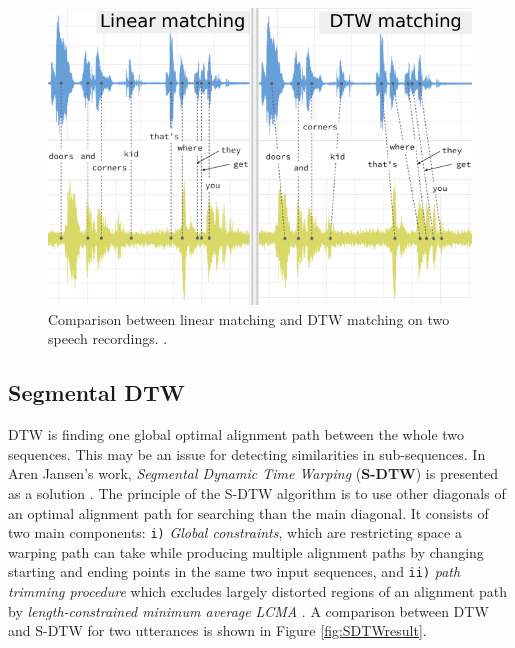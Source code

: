 \documentclass{ExcelAtFIT}
\begin{document}
\begin{figure}[hbt]
	\centering
	\includegraphics[width=\linewidth]{images/EuclideanDTWedited2.pdf}
	\caption{Comparison between linear matching and DTW matching on two speech recordings. \cite{DTWnotebook}.}
    \label{fig:EuclidDTW}
\end{figure}

\subsection{Segmental DTW}
DTW is finding one global optimal alignment path between the whole two sequences. This may be an issue for detecting similarities in sub-sequences. In Aren Jansen's work, \textit{Segmental Dynamic Time Warping} (\textbf{S-DTW}) is presented as a solution \cite{ArenJansen}. 
The principle of the S-DTW algorithm is to use other diagonals of an optimal alignment path for searching than the main diagonal. It consists of two main components: \texttt{i)} \textit{Global constraints}, which are restricting space a warping path can take while producing multiple alignment paths by changing starting and ending points in the same two input sequences, and \texttt{ii)} \textit{path trimming procedure} which excludes largely distorted regions of an alignment path by \textit{length-constrained minimum average} \emph{LCMA} \cite{SDTWpark2006unsupervised}.
A comparison between DTW and S-DTW for two utterances is shown in Figure \ref{fig:SDTWresult}.
\end{document}
